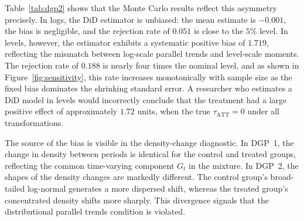 \documentclass[12pt]{article}
\theoremstyle{remark}
\begin{document}
Table~\ref{tab:dgp2} shows that the Monte Carlo results reflect 
this asymmetry precisely. In logs, the DiD estimator is unbiased: 
the mean estimate is $-0.001$, the bias is negligible, and the 
rejection rate of $0.051$ is close to the $5\%$ level. 
In levels, however, the estimator exhibits a systematic positive 
bias of $1.719$, reflecting the mismatch between log-scale parallel 
trends and level-scale moments. The rejection rate of $0.188$ is 
nearly four times the nominal level, and as shown in Figure~\ref{fig:sensitivity}, 
this rate increases monotonically with sample size as the fixed bias 
dominates the shrinking standard error. A researcher who estimates 
a DiD model in levels would incorrectly conclude that the treatment 
had a large positive effect of approximately $1.72$ units, when the 
true $\tau_{\text{ATT}} = 0$ under all transformations.


\begin{table}[htbp]
  \centering
  \caption{Monte Carlo results: DGP~2 (unfavorable case)}
  \label{tab:dgp2}
  
  \vspace{0.5cm} 
  \caption*{\small Note. $B = 2{,}000$ replications, $n = 1{,}000$ per cell. True ATT $= 0$ under all transformations.}
  \vspace{-0.5cm} 
\end{table}

The source of the bias is visible in the density-change diagnostic. In DGP~1, the change in density between periods is identical for the control and treated groups, reflecting the common time-varying component $G_t$ in the mixture. In DGP~2, the shapes of the density changes are markedly different. The control group's broad-tailed log-normal generates a more dispersed shift, whereas the treated group's concentrated density shifts more sharply. This divergence signals that the distributional parallel trends condition is violated.
\end{document}
